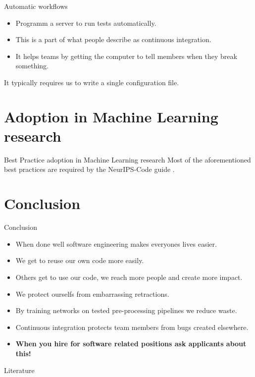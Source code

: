 \documentclass{beamer}
\begin{document}
    \begin{frame}{Automatic workflows}
      \begin{itemize}
        \item Programm a server to run tests automatically.
        \item This is a part of what people describe as continuous integration.
        \item It helps teams by getting the computer to tell members when they break something.
      \end{itemize}
      It typically requires us to write a single configuration file.
    \end{frame}

    \section{Adoption in Machine Learning research}
    \begin{frame}{Best Practice adoption in Machine Learning research}
      Most of the aforementioned best practices are required by the NeurIPS-Code guide \cite{NeuripsCodeguide}.
      \begin{figure}
        \centering
        
        
        
        
      \end{figure}
    \end{frame}


    \section{Conclusion}
    \begin{frame}{Conclusion}
        \begin{itemize}
            \item When done well software engineering makes everyones lives easier.
            \item We get to reuse our own code more easily.
            \item Others get to use our code, we reach more people and create more impact.
            \item We protect ourselfs from embarrassing retractions.
            \item By training networks on tested pre-processing pipelines we reduce waste.
            \item Continuous integration protects team members from bugs created elsewhere.
            \item \textbf{When you hire for software related positions ask applicants about this!}
        \end{itemize}
    \end{frame}

    \begin{frame}[allowframebreaks]{Literature}
      \printbibliography
    \end{frame}
\end{document}
